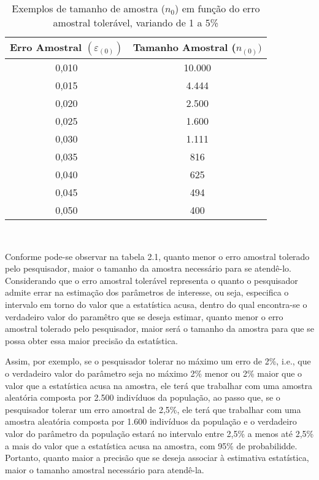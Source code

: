 \begin{table}[!htb]
    \centering
    {
    \caption{Exemplos de tamanho de amostra ($n_{0}$) em função do erro amostral tolerável, variando de 1 a 5\%}
    \label{amostras}
    \vspace{0.1cm}
\begin{tabular}{c|c}
  \hline\hline
  Erro Amostral $(\varepsilon_{(0)})$   & Tamanho Amostral ($n_{(0)})$ \\
  \hline\hline
  0,010    &  10.000 \\
  0,015    &  4.444 \\
  0,020    &  2.500 \\
  0,025    &  1.600 \\
  0,030    &  1.111 \\
  0,035    &  816 \\
  0,040    &  625 \\
  0,045    &  494 \\
  0,050    &  400 \\
  \hline\hline
\end{tabular}}
\\
\hspace{-1.0cm}
\end{table}


Conforme pode-se observar na tabela 2.1, quanto menor o erro
amostral tolerado pelo pesquisador, maior o tamanho da amostra
necessário para se atendê-lo. Considerando que o erro amostral
tolerável representa o quanto o pesquisador admite errar na
estimação dos parâmetros de interesse, ou seja, especifica o
intervalo em torno do valor que a estatística acusa, dentro do
qual encontra-se o verdadeiro valor do paramêtro que se deseja
estimar, quanto menor o erro amostral tolerado pelo pesquisador,
maior será o tamanho da amostra para que se possa obter essa maior
precisão da estatística.\vskip0.3cm



Assim, por exemplo, se o pesquisador tolerar no máximo um erro de 2\%, i.e., que o verdadeiro valor do parâmetro seja no máximo 2\% menor ou 2\% maior que o valor que a estatística acusa na amostra, ele terá que trabalhar com uma amostra aleatória composta por 2.500 indivíduos da população, ao passo que, se o pesquisador tolerar um erro amostral de 2,5\%, ele terá que trabalhar com uma amostra aleatória composta por 1.600 indivíduos da população e o verdadeiro valor do parâmetro da população estará no intervalo entre 2,5\% a menos até 2,5\% a mais do valor que a estatística acusa na amostra, com 95\% de probabilidde. Portanto, quanto maior a precisão que se deseja associar à estimativa estatística, maior o tamanho amostral necessário para atendê-la.\vskip0.3cm


